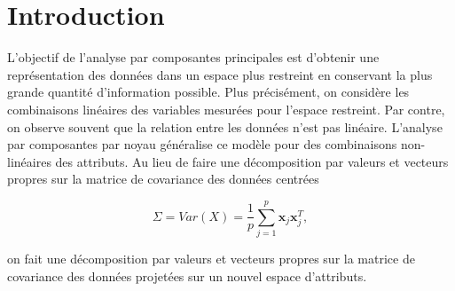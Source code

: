 \section{Introduction}


L'objectif de l'analyse par composantes principales est d'obtenir une représentation des données dans un espace plus restreint en conservant la plus grande quantité d'information possible. Plus précisément, on considère les combinaisons linéaires des variables mesurées pour l'espace restreint. Par contre, on observe souvent que la relation entre les données n'est pas linéaire. L'analyse par composantes par noyau généralise ce modèle pour des combinaisons non-linéaires des attributs. Au lieu de faire une décomposition par valeurs et vecteurs propres sur la matrice de covariance des données centrées

$$\Sigma = Var(X) = \frac{1}{p} \sum_{j = 1}^{p}   \textbf{x}_j\textbf{x}_j^{T},$$

on fait une décomposition par valeurs et vecteurs propres sur la matrice de covariance des données projetées sur un nouvel espace d'attributs.

